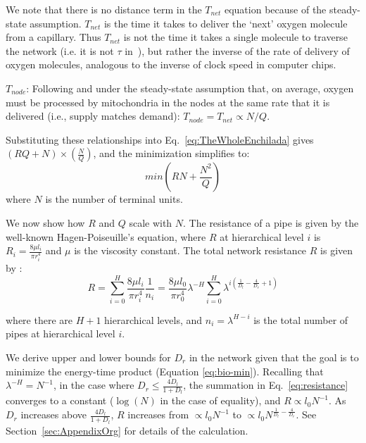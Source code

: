 \documentclass[12pt]{article}
\begin{document}
We note that there is no distance term in the $T_{net}$ equation because of the
steady-state assumption. $T_{net}$ is the time it takes to deliver the `next'
oxygen molecule from a capillary. Thus $T_{net}$ is not the time it takes a
single molecule to traverse the network (i.e. it is not $\tau$
in~\cite{banavar10}), but rather the inverse of the rate of delivery of
oxygen molecules, analogous to the inverse of clock speed in computer chips.

$T_{node}$: Following \cite{banavar10} and under the steady-state assumption
that, on average, oxygen must be processed by mitochondria in the nodes at the
same rate that it is delivered (i.e., supply matches demand): $T_{node}=
T_{net} \propto N/Q$.

Substituting these relationships into Eq.~\ref{eq:TheWholeEnchilada}  gives
$(RQ + N) \times (\frac{N}{Q})$, and the minimization simplifies to:
\begin{equation}
 min (RN + \frac{N^2}{Q})
\label{eq:bio-min}
\end{equation}
\noindent where $N$ is the number of terminal units.  

We now show how $R$ and $Q$ scale with $N$. The resistance of a pipe is given by the well-known Hagen-Poiseuille's
equation, where $R$ at hierarchical level $i$ is $R_i = \frac{8\mu l_i}{\pi
r_i^4}$ and $\mu$ is the viscosity constant.  The total network resistance
$R$ is given by \cite{west97}:
\begin{equation}
\label{eq:resistance}
R = \sum_{i=0}^H \frac{8\mu l_i}{\pi r_i^4}\frac{1}{n_i}
= \frac{8\mu l_0}{\pi r_0^4} \lambda^{-H}\sum_{i=0}^H \lambda^{i 
\left(\frac{1}{D_l} - \frac{4}{D_r} + 1 \right)}
\end{equation}

\noindent where there are $H+1$ hierarchical levels, and $n_i = \lambda^{H-i}$
is the total number of pipes at hierarchical level $i$.  

We derive upper and lower bounds for $D_r$ in the network given that the goal
is to minimize the energy-time product (Equation \ref{eq:bio-min}).  Recalling
that $\lambda^{-H} = N^{-1}$, in the case
where $D_r \leq \frac{4D_l}{1+D_l}$, the summation in Eq.~\ref{eq:resistance} converges to a
constant ($\log(N)$ in the case of equality), and $R \propto l_0 N^{-1}$. As
$D_r$ increases above $\frac{4D_l}{1+D_l}$, $R$ increases from $\propto l_0 N^{-1}$ to $\propto
l_0 N^{\frac{1}{D_l} - \frac{4}{D_r}}$. 
See Section~\ref{sec:AppendixOrg} for details of the calculation.
\end{document}

